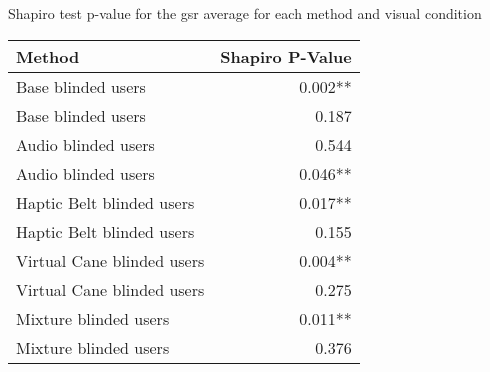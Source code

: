 
\centering
\caption{Shapiro test p-value for the gsr average for each method and visual condition}
\label{tab:shapiro_gsr_avg}
\begin{tabular}{lr}
\toprule
                    Method & Shapiro P-Value \\
\midrule
        Base blinded users &         0.002** \\
        Base blinded users &           0.187 \\
       Audio blinded users &           0.544 \\
       Audio blinded users &         0.046** \\
 Haptic Belt blinded users &         0.017** \\
 Haptic Belt blinded users &           0.155 \\
Virtual Cane blinded users &         0.004** \\
Virtual Cane blinded users &           0.275 \\
     Mixture blinded users &         0.011** \\
     Mixture blinded users &           0.376 \\
\bottomrule
\end{tabular}
